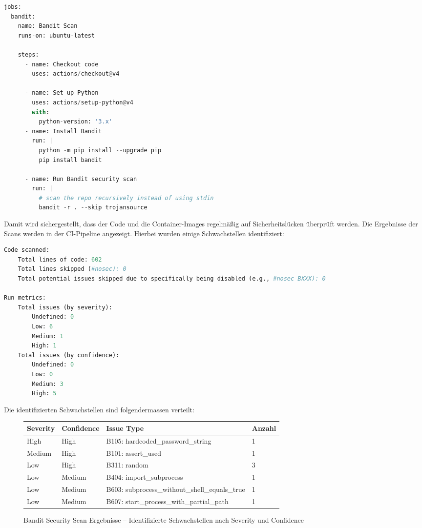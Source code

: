 \documentclass{article}
\begin{document}
\begin{lstlisting}[language=python,caption={bandit workflow file}]
jobs:
  bandit:
    name: Bandit Scan
    runs-on: ubuntu-latest

    steps:
      - name: Checkout code
        uses: actions/checkout@v4

      - name: Set up Python
        uses: actions/setup-python@v4
        with:
          python-version: '3.x'
      - name: Install Bandit
        run: |
          python -m pip install --upgrade pip
          pip install bandit

      - name: Run Bandit security scan
        run: |
          # scan the repo recursively instead of using stdin
          bandit -r . --skip trojansource
\end{lstlisting}

\noindent
Damit wird sichergestellt, dass der Code und die Container-Images regelmäßig auf Sicherheitslücken
überprüft werden. Die Ergebnisse der Scans werden in der CI-Pipeline angezeigt.
\noindent
Hierbei wurden einige Schwachstellen identifiziert:

\begin{lstlisting}[language=python,caption={bandit scan results}]
Code scanned:
	Total lines of code: 602
	Total lines skipped (#nosec): 0
	Total potential issues skipped due to specifically being disabled (e.g., #nosec BXXX): 0

Run metrics:
	Total issues (by severity):
		Undefined: 0
		Low: 6
		Medium: 1
		High: 1
	Total issues (by confidence):
		Undefined: 0
		Low: 0
		Medium: 3
		High: 5
\end{lstlisting}

\newpage

\noindent
Die identifizierten Schwachstellen sind folgendermassen verteilt:

\begin{figure}[H]
  \centering
  \begin{tabular}{|l|l|l|l|}
    \hline
    \textbf{Severity} & \textbf{Confidence} & \textbf{Issue Type} & \textbf{Anzahl} \\
    \hline
    High & High & B105: hardcoded\_password\_string & 1 \\
    \hline
    Medium & High & B101: assert\_used & 1 \\
    \hline
    Low & High & B311: random & 3 \\
    \hline
    Low & Medium & B404: import\_subprocess & 1 \\
    \hline
    Low & Medium & B603: subprocess\_without\_shell\_equals\_true & 1 \\
    \hline
    Low & Medium & B607: start\_process\_with\_partial\_path & 1 \\
    \hline
  \end{tabular}
  \caption{Bandit Security Scan Ergebnisse -- Identifizierte Schwachstellen nach Severity und Confidence}
  \label{fig:bandit}
\end{figure}
\end{document}
